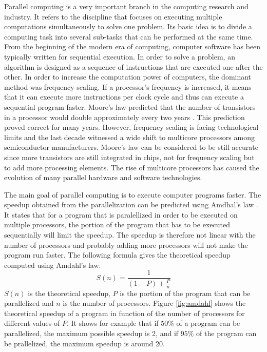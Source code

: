 Parallel computing is a very important branch in the computing research and industry. It refers to the discipline that focuses on executing multiple computations simultaneously to solve one problem. Its basic idea is to divide a computing task into several sub-tasks that can be performed at the same time. From the beginning of the modern era of computing, computer software has been typically written for sequential execution. In order to solve a problem, an algorithm is designed as a sequence of instructions that are executed one after the other. In order to increase the computation power of computers, the dominant method was frequency scaling. If a processor's frequency is increased, it means that it can execute more instructions per clock cycle and thus can execute a sequential program faster. Moore's law predicted that the number of transistors in a processor would double approximately every two years \cite{moore:1965}. This prediction proved correct for many years. However, frequency scaling is facing technological limits and the last decade witnessed a wide shift to multicore processors among semiconductor manufacturers. Moore's law can be considered to be still accurate since more transistors are still integrated in chips, not for frequency scaling but to add more processing elements. The rise of multicore processors has caused the evolution of many parallel hardware and software technologies.

The main goal of parallel computing is to execute computer programs faster. The speedup obtained from the parallelization can be predicted using Amdhal's law \cite{amdahl:1967}. It states that for a program that is paralellized in order to be executed on multiple processors, the portion of the program that has to be executed sequentially will limit the speedup. The speedup is therefore not linear with the number of processors and probably adding more processors will not make the program run faster. The following formula gives the theoretical speedup computed using Amdahl's law.
\begin{equation}
S(n) = \frac{1}{(1-P) + \frac{P}{n}}
\end{equation}
$S(n)$ is the theoretical speedup, $P$ is the portion of the program that can be parallelized and $n$ is the number of processors. Figure \ref{fig:amdahl} shows the theoretical speedup of a program in function of the number of processors for different values of $P$. It shows for example that if $50\%$ of a program can be parallelized, the maximum possible speedup is 2, and if $95\%$ of the program can be prallelized, the maximum speedup is around 20.

